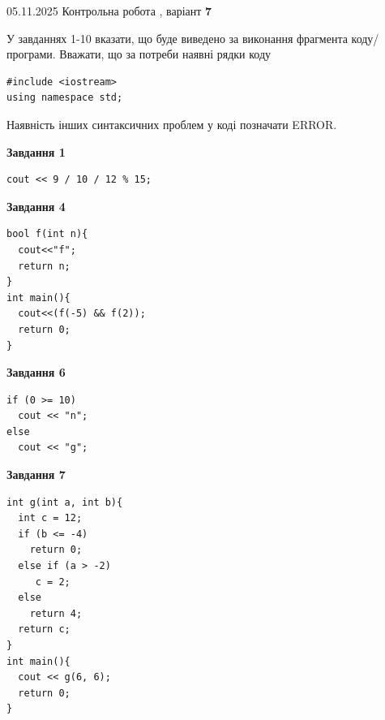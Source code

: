 \documentclass[12pt, ukrainian]{article}
\begin{document}
{\Large{05.11.2025 Контрольна робота , варіант  \No \textbf { 7 }\par}}
{
\begin {large}
У завданнях 1-10 вказати, що буде виведено за виконання фрагмента коду/про\-гра\-ми.
Вважати, що за потреби наявні рядки коду
\begin{verbatim}
#include <iostream>
using namespace std;
\end{verbatim}
Наявність інших синтаксичних проблем у коді позначати ERROR.

\begin{minipage}[t]{7.0cm}

\begin{center}
\textbf{Завдання 1}
\end{center}
\vspace{-8mm}

\begin{verbatim}
cout << 9 / 10 / 12 % 15;
\end{verbatim}



\begin{center}
\textbf{Завдання 4}
\end{center}
\vspace{-8mm}

\begin{verbatim}
bool f(int n){
  cout<<"f";
  return n;
}
int main(){
  cout<<(f(-5) && f(2));
  return 0;
}
\end{verbatim}



\begin{center}
\textbf{Завдання 6}
\end{center}
\vspace{-8mm}

\begin{verbatim}
if (0 >= 10)
  cout << "n";
else
  cout << "g";
\end{verbatim}



\begin{center}
\textbf{Завдання 7}
\end{center}
\vspace{-8mm}

\begin{verbatim}
int g(int a, int b){
  int c = 12;
  if (b <= -4)
    return 0;
  else if (a > -2)
     c = 2;
  else
    return 4;
  return c;
}
int main(){
  cout << g(6, 6);
  return 0;
}
\end{verbatim}


\end{minipage}
\end{large}}
\end{document}
